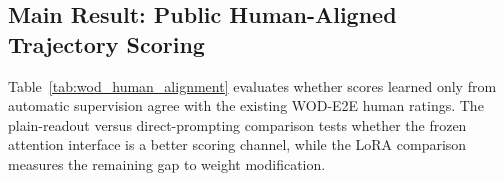 \subsection{Main Result: Public Human-Aligned Trajectory Scoring}
\label{sec:wod_human_alignment}

Table~\ref{tab:wod_human_alignment} evaluates whether scores learned only from
automatic supervision agree with the existing WOD-E2E human ratings. The
plain-readout versus direct-prompting comparison tests whether the frozen
attention interface is a better scoring channel, while the LoRA comparison
measures the remaining gap to weight modification.

\begin{table}[t]
    \centering
    \small
    \setlength{\tabcolsep}{4.2pt}
    \renewcommand{\arraystretch}{1.10}
    \caption{
        Public human-aligned trajectory scoring on WOD-E2E.
        All learned methods use zero task-specific human labels during training
        and model selection.
    }
    \label{tab:wod_human_alignment}
\end{table}
